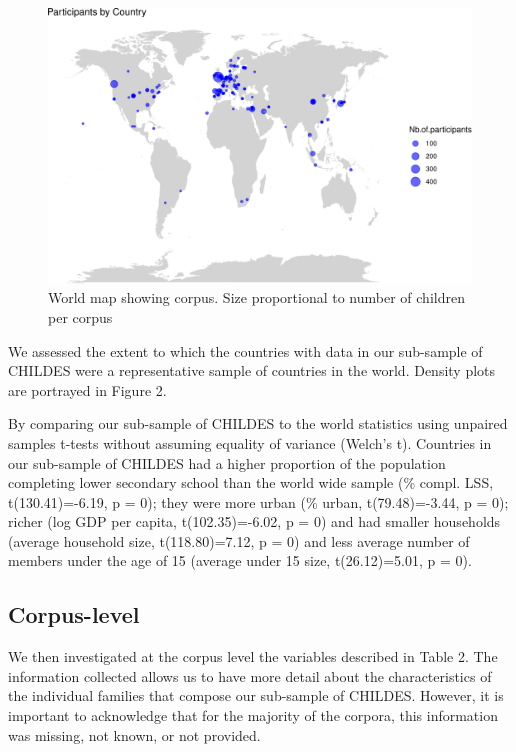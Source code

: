 \documentclass[
  man,floatsintext]{apa6}
\begin{document}
\begin{figure}
\centering
\includegraphics{CHILDES_short_files/figure-latex/unnamed-chunk-1-1.pdf}
\caption{\label{fig:unnamed-chunk-1}World map showing corpus. Size proportional to number of children per corpus}
\end{figure}

We assessed the extent to which the countries with data in our sub-sample of CHILDES were a representative sample of countries in the world. Density plots are portrayed in Figure 2.

By comparing our sub-sample of CHILDES to the world statistics using unpaired samples t-tests without assuming equality of variance (Welch's t). Countries in our sub-sample of CHILDES had a higher proportion of the population completing lower secondary school than the world wide sample (\% compl. LSS, t(130.41)=-6.19, p = 0); they were more urban (\% urban, t(79.48)=-3.44, p = 0); richer (log GDP per capita, t(102.35)=-6.02, p = 0) and had smaller households (average household size, t(118.80)=7.12, p = 0) and less average number of members under the age of 15 (average under 15 size, t(26.12)=5.01, p = 0).

\subsection{Corpus-level}\label{corpus-level}

We then investigated at the corpus level the variables described in Table 2. The information collected allows us to have more detail about the characteristics of the individual families that compose our sub-sample of CHILDES. However, it is important to acknowledge that for the majority of the corpora, this information was missing, not known, or not provided.
\end{document}

